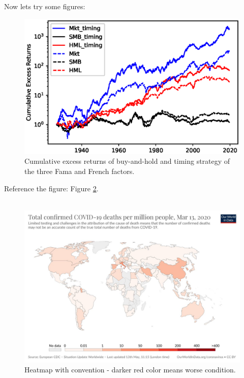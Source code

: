 \documentclass[a4paper,12pt]{article}
\begin{document}
	Now lets try some figures:
		\begin{figure}[H]
			\centering
			\includegraphics[width=\textwidth]{img/Replication.eps}
			\caption{Cumulative excess returns of buy-and-hold and timing strategy of the three Fama and French factors.}
            \label{fig:replication}
	\end{figure}
\noindent	Reference the figure: Figure \ref{fig:replication}. \cite{Busse}\\
	
\noindent \blindtext	\\

\noindent \blindtext
	
\begin{figure}[H]
			\centering
			\includegraphics[width=\textwidth]{img/covid.jpg}
			\caption{Heatmap with convention - darker red color means worse condition.}
            \label{fig:replication}
	\end{figure}
\end{document}
